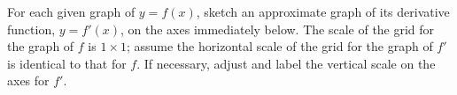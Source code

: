 \begin{activity} \label{A:1.4.1}
For each given graph of $y = f(x)$, sketch an approximate graph of its derivative function, $y = f'(x)$, on the axes immediately below.  The scale of the grid for the graph of $f$ is $1 \times 1$; assume the horizontal scale of the grid for the graph of $f'$ is identical to that for $f$.  If necessary, adjust and label the vertical scale on the axes for  $f'$.

\begin{center}


\end{center}
\end{activity}
